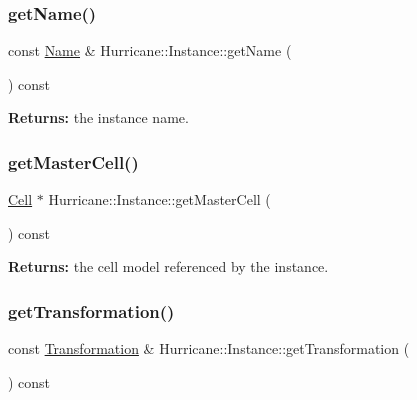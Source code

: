 \subsubsection{\texorpdfstring{get\+Name()}{getName()}}
{\footnotesize\ttfamily const \hyperlink{classHurricane_1_1Name}{Name} \& Hurricane\+::\+Instance\+::get\+Name (\begin{DoxyParamCaption}{ }\end{DoxyParamCaption}) const\hspace{0.3cm}{\ttfamily [inline]}}

{\bfseries Returns\+:} the instance name. \mbox{\label{classHurricane_1_1Instance_ad08a772e5e36582070cdc407cfcc1a64}} 
\subsubsection{\texorpdfstring{get\+Master\+Cell()}{getMasterCell()}}
{\footnotesize\ttfamily \hyperlink{classHurricane_1_1Cell}{Cell} $\ast$ Hurricane\+::\+Instance\+::get\+Master\+Cell (\begin{DoxyParamCaption}{ }\end{DoxyParamCaption}) const\hspace{0.3cm}{\ttfamily [inline]}}

{\bfseries Returns\+:} the cell model referenced by the instance. \mbox{\label{classHurricane_1_1Instance_a5042051d648fd93548dc6c5e14782645}} 
\subsubsection{\texorpdfstring{get\+Transformation()}{getTransformation()}}
{\footnotesize\ttfamily const \hyperlink{classHurricane_1_1Transformation}{Transformation} \& Hurricane\+::\+Instance\+::get\+Transformation (\begin{DoxyParamCaption}{ }\end{DoxyParamCaption}) const\hspace{0.3cm}{\ttfamily [inline]}}

